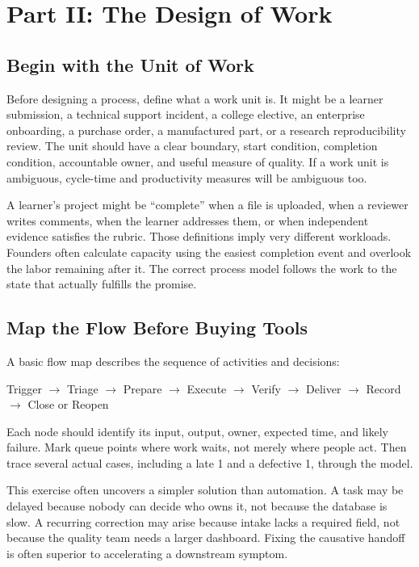 \section*{Part II: The Design of Work}

\subsection{Begin with the Unit of Work}
\label{sec:unit_of_work}

Before designing a process, define what a work unit is. It might be a learner submission, a technical support incident, a college elective, an enterprise onboarding, a purchase order, a manufactured part, or a research reproducibility review. The unit should have a clear boundary, start condition, completion condition, accountable owner, and useful measure of quality. If a work unit is ambiguous, cycle-time and productivity measures will be ambiguous too.

A learner's project might be ``complete'' when a file is uploaded, when a reviewer writes comments, when the learner addresses them, or when independent evidence satisfies the rubric. Those definitions imply very different workloads. Founders often calculate capacity using the easiest completion event and overlook the labor remaining after it. The correct process model follows the work to the state that actually fulfills the promise.

\subsection{Map the Flow Before Buying Tools}
\label{sec:map_the_flow}

A basic flow map describes the sequence of activities and decisions:
\begin{center}
\small
Trigger $\longrightarrow$ Triage $\longrightarrow$ Prepare $\longrightarrow$ Execute $\longrightarrow$ Verify $\longrightarrow$ Deliver $\longrightarrow$ Record $\longrightarrow$ Close or Reopen
\end{center}

Each node should identify its input, output, owner, expected time, and likely failure. Mark queue points where work waits, not merely where people act. Then trace several actual cases, including a late 1 and a defective 1, through the model.

This exercise often uncovers a simpler solution than automation. A task may be delayed because nobody can decide who owns it, not because the database is slow. A recurring correction may arise because intake lacks a required field, not because the quality team needs a larger dashboard. Fixing the causative handoff is often superior to accelerating a downstream symptom.

